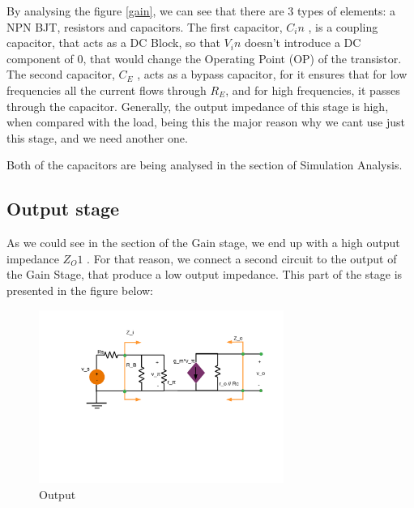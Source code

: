 By analysing the figure \ref{gain}, we can see that there are 3 types of elements: a NPN BJT, resistors and capacitors.
The first capacitor, $C_in$ , is a coupling capacitor, that acts as a DC Block, so that $V_in$ doesn’t
introduce a DC component of 0, that would change the Operating Point (OP) of the transistor.
The second capacitor, $C _E$ , acts as a bypass capacitor, for it ensures that for low frequencies
all the current flows through $R_E$, and for high frequencies, it passes through the capacitor.
Generally, the output impedance of this stage is high, when compared with the load,
being this the major reason why we cant use just this stage, and we need another one. \par
Both of the capacitors are being analysed in the section of Simulation Analysis.

\subsection{Output stage}

As we could see in the section of the Gain stage, we end up with a high output impedance $Z_O1$ . For that reason, we
connect a second circuit to the output of the Gain Stage, that produce a low output impedance.
This part of the stage is presented in the figure below:

\begin{figure}[H] 
\centering
\includegraphics[width = 8cm]{Incremental_Gain.pdf} 
\caption{Output}
\label{output}
\end{figure}

